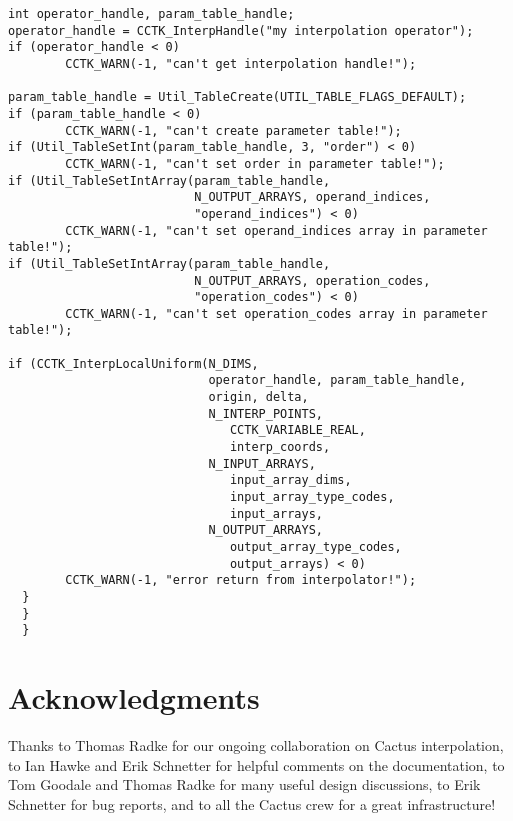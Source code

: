 \begin{verbatim}
int operator_handle, param_table_handle;
operator_handle = CCTK_InterpHandle("my interpolation operator");
if (operator_handle < 0)
        CCTK_WARN(-1, "can't get interpolation handle!");

param_table_handle = Util_TableCreate(UTIL_TABLE_FLAGS_DEFAULT);
if (param_table_handle < 0)
        CCTK_WARN(-1, "can't create parameter table!");
if (Util_TableSetInt(param_table_handle, 3, "order") < 0)
        CCTK_WARN(-1, "can't set order in parameter table!");
if (Util_TableSetIntArray(param_table_handle,
                          N_OUTPUT_ARRAYS, operand_indices,
                          "operand_indices") < 0)
        CCTK_WARN(-1, "can't set operand_indices array in parameter table!");
if (Util_TableSetIntArray(param_table_handle,
                          N_OUTPUT_ARRAYS, operation_codes,
                          "operation_codes") < 0)
        CCTK_WARN(-1, "can't set operation_codes array in parameter table!");

if (CCTK_InterpLocalUniform(N_DIMS,
                            operator_handle, param_table_handle,
                            origin, delta,
                            N_INTERP_POINTS,
                               CCTK_VARIABLE_REAL,
                               interp_coords,
                            N_INPUT_ARRAYS,
                               input_array_dims,
                               input_array_type_codes,
                               input_arrays,
                            N_OUTPUT_ARRAYS,
                               output_array_type_codes,
                               output_arrays) < 0)
        CCTK_WARN(-1, "error return from interpolator!");
  }
  }
  }
\end{verbatim}


\section{Acknowledgments}

Thanks to Thomas Radke for our ongoing collaboration on Cactus
interpolation,
to Ian Hawke and Erik Schnetter for helpful comments on the documentation,
to Tom Goodale and Thomas Radke for many useful design discussions,
to Erik Schnetter for bug reports,
and to all the Cactus crew for a great infrastructure!




